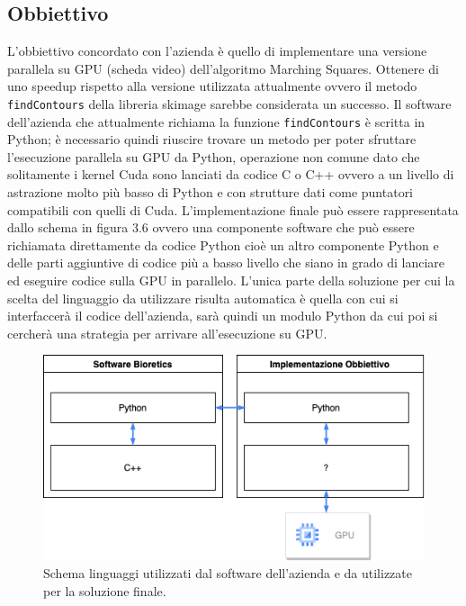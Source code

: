 \documentclass[12pt,a4paper]{report}
\begin{document}
\subsection{Obbiettivo}
L'obbiettivo concordato con l'azienda è quello di implementare una versione parallela su GPU (scheda video) dell'algoritmo Marching Squares. Ottenere di uno speedup rispetto alla versione utilizzata attualmente ovvero il metodo \verb|findContours| della libreria skimage sarebbe considerata un successo. \newline
Il software dell'azienda che attualmente richiama la funzione \verb|findContours| è scritta in Python; è necessario quindi riuscire trovare un metodo per poter sfruttare l'esecuzione parallela su GPU da Python, operazione non comune dato che solitamente i kernel Cuda sono lanciati da codice C o C++ ovvero a un livello di astrazione molto più basso di Python e con strutture dati come puntatori compatibili con quelli di Cuda. \newline
L'implementazione finale può essere rappresentata dallo schema in figura 3.6 ovvero una componente software che può essere richiamata direttamente da codice Python cioè un altro componente Python e delle parti aggiuntive di codice più a basso livello che siano in grado di lanciare ed eseguire codice sulla GPU in parallelo. L'unica parte della soluzione per cui la scelta del linguaggio da utilizzare risulta automatica è quella con cui si interfaccerà il codice dell'azienda, sarà quindi un modulo Python da cui poi si cercherà una strategia per arrivare all'esecuzione su GPU. \newline


\begin{figure}[H]
    \centering
    \includegraphics[scale=0.8]{img/Diagram_Python_GPU.drawio.png}
    \caption{Schema linguaggi utilizzati dal software dell'azienda e da utilizzate per la soluzione finale.}
\end{figure}
\end{document}
